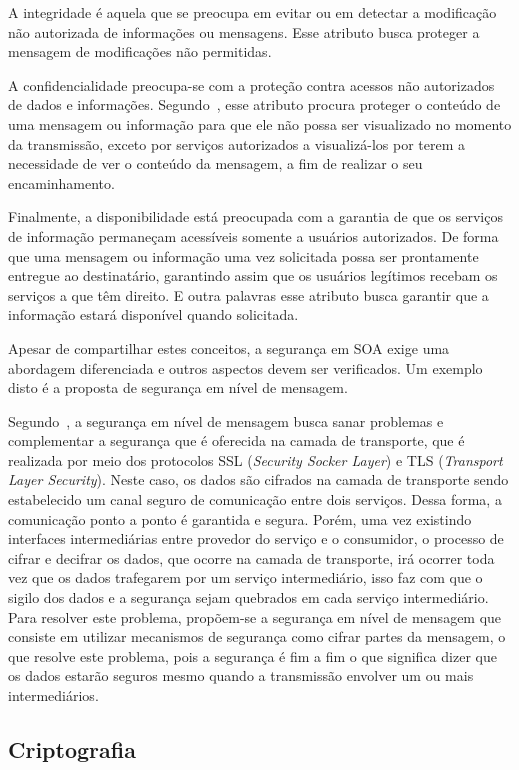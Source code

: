 A integridade é aquela que se preocupa em evitar ou em detectar a modificação não autorizada de informações ou mensagens. Esse atributo busca proteger a mensagem de modificações não permitidas.

A confidencialidade preocupa-se com a proteção contra acessos não autorizados de dados e informações. Segundo~\cite{Bertino2010}, esse atributo procura proteger o conteúdo de uma mensagem ou informação  para que ele não possa ser visualizado no momento da transmissão, exceto por serviços autorizados a visualizá-los por terem a necessidade de ver o conteúdo da mensagem, a fim de realizar o seu encaminhamento.

Finalmente, a disponibilidade está preocupada com a garantia de que os serviços de informação permaneçam acessíveis somente a usuários autorizados. De forma que uma mensagem ou informação uma vez solicitada possa ser prontamente entregue ao destinatário, garantindo assim que os usuários legítimos recebam os serviços a que têm direito. E outra palavras esse atributo busca garantir que a informação estará disponível quando solicitada.

Apesar de compartilhar estes conceitos,  a segurança em SOA exige uma abordagem  diferenciada e outros aspectos devem ser verificados. Um exemplo disto é a proposta de segurança em nível de mensagem.

Segundo~\cite{SOASecurity2008}, a segurança em nível de mensagem busca sanar problemas e complementar a segurança que é oferecida na camada de transporte, que é realizada por meio dos protocolos SSL (\emph{Security Socker Layer}) e TLS (\emph{Transport Layer Security}). Neste caso, os dados são cifrados na camada de transporte sendo estabelecido um canal seguro de comunicação entre dois serviços. Dessa forma, a comunicação ponto a ponto é garantida e segura. Porém, uma vez existindo interfaces intermediárias entre provedor do serviço e o consumidor, o processo de cifrar e decifrar os dados, que ocorre na camada de transporte, irá ocorrer toda vez que os dados trafegarem por um serviço intermediário, isso faz com que o sigilo dos dados e a segurança sejam quebrados em cada serviço intermediário. Para resolver este problema, propõem-se a segurança em nível de mensagem que consiste em utilizar mecanismos de segurança como cifrar partes da mensagem, o que resolve este problema, pois a segurança é fim a fim o que significa dizer que os dados estarão seguros mesmo quando a transmissão envolver um ou mais intermediários.

\subsection{Criptografia}

